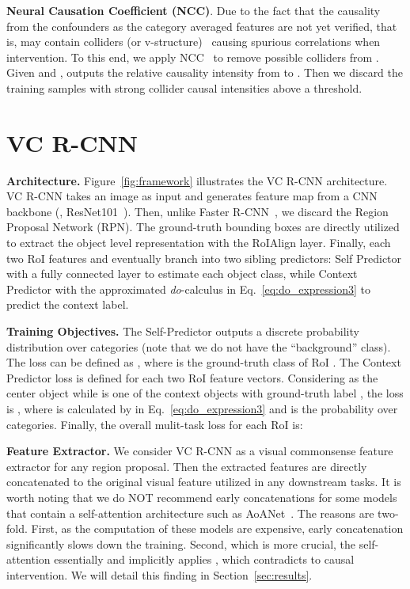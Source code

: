 \documentclass[10pt,twocolumn,letterpaper]{article}
\begin{document}
\noindent\textbf{Neural Causation Coefficient (NCC)}.
Due to the fact that the causality from the confounders as the category averaged features are not yet verified, that is,   may contain colliders (or v-structure)~\cite{pearl2016causal} causing spurious correlations when intervention. To this end, we apply NCC~\cite{lopez2017discovering} to remove possible colliders from .
Given  and ,   outputs the relative causality intensity from  to . Then we discard the training samples with strong collider causal intensities above a threshold.







\section{VC R-CNN}



\noindent\textbf{Architecture.}
Figure~\ref{fig:framework} illustrates the VC R-CNN architecture. 
VC R-CNN takes an image as input and generates feature map from a CNN backbone (\eg, ResNet101~\cite{he2016deep}). 
Then, unlike Faster R-CNN~\cite{ren2015faster}, we discard the Region Proposal Network (RPN).
The ground-truth bounding boxes are directly utilized to extract the object level representation with the RoIAlign layer. Finally, each two RoI features  and  eventually branch into two sibling predictors: Self Predictor with a fully connected layer to estimate each object class, while Context Predictor with the approximated \emph{do}-calculus in Eq.~\eqref{eq:do_expression3} to predict the context label.





\noindent\textbf{Training Objectives.}
The Self-Predictor outputs a discrete probability distribution  over  categories (note that we do not have the ``background'' class).
The loss can be defined as , where  is the ground-truth class of RoI . The Context Predictor loss  is defined for each two RoI feature vectors. Considering  as the center object while  is one of the  context objects with ground-truth label ,
the loss is , where  is calculated by  in Eq.~\eqref{eq:do_expression3} and   is the probability over  categories.
Finally, the overall mulit-task loss for each RoI  is:




\noindent\textbf{Feature Extractor.}
We consider VC R-CNN as a visual commonsense feature extractor for any region proposal. Then the extracted features are directly concatenated to the original visual feature utilized in any downstream tasks. It is worth noting that we do NOT recommend early concatenations for some models that contain a self-attention architecture such as AoANet~\cite{huang2019attention}. The reasons are two-fold. First, as the computation of these models are expensive, early concatenation significantly slows down the training. Second, which is more crucial, the self-attention essentially and implicitly applies , which contradicts to causal intervention. We will detail this finding in Section~\ref{sec:results}.
\end{document}
